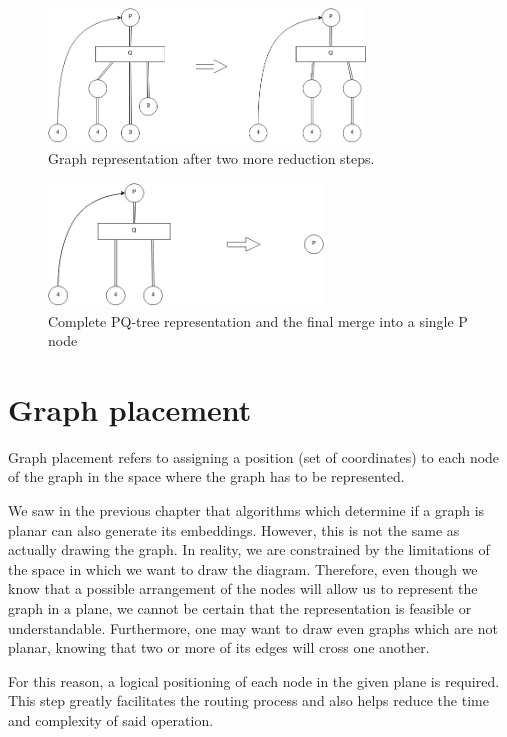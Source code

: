 \begin{figure}[ht] \centering
\includegraphics[width=0.75\textwidth]{img/algdesing/vertex_reduction_step_2.png}
\caption{Graph representation after two more reduction steps.} \end{figure}

\begin{figure}[ht] \centering
\includegraphics[width=0.65\textwidth]{img/algdesing/vertex_reduction_3.png}
\caption{Complete PQ-tree representation and the final merge into a single P node} \end{figure}

\section{Graph placement}

Graph placement refers to assigning a position (set of coordinates) to each node of the graph in the space where 
the graph has to be represented.

We saw in the previous chapter that algorithms which determine if a graph is planar can also generate its 
embeddings. However, this is not the same as actually drawing the graph. In reality, we are constrained by the 
limitations of the space in which we want to draw the diagram. Therefore, even though we know that a possible 
arrangement of the nodes will allow us to represent the graph in a plane, we cannot be certain that the 
representation is feasible or understandable. Furthermore, one may want to draw even graphs which are not planar, 
knowing that two or more of its edges will cross one another.

For this reason, a logical positioning of each node in the given plane is required. This step greatly facilitates 
the routing process and also helps reduce the time and complexity of said operation.


